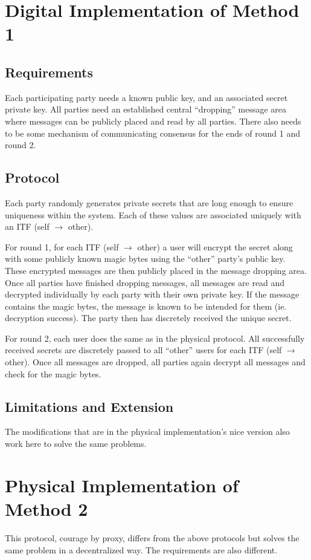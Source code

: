 \documentclass[conference]{IEEEtran}
\begin{document}
\section{Digital Implementation of Method 1}
\subsection{Requirements}
Each participating party needs a known public key, and an associated secret private key. All parties need an established central “dropping” message area where messages can be publicly placed and read by all parties. There also needs to be some mechanism of communicating consensus for the ends of round 1 and round 2.

\subsection{Protocol}
Each party randomly generates private secrets that are long enough to ensure uniqueness within the system. Each of these values are associated uniquely with an ITF (self $\rightarrow$ other).

For round 1, for each ITF (self $\rightarrow$ other) a user will encrypt the secret along with some publicly known magic bytes using the “other” party’s public key. These encrypted messages are then publicly placed in the message dropping area. Once all parties have finished dropping messages, all messages are read and decrypted individually by each party with their own private key. If the message contains the magic bytes, the message is known to be intended for them (ie. decryption success). The party then has discretely received the unique secret.

For round 2, each user does the same as in the physical protocol. All successfully received secrets are discretely passed to all “other” users for each ITF (self $\rightarrow$ other). Once all messages are dropped, all parties again decrypt all messages and check for the magic bytes.

\subsection{Limitations and Extension}
The modifications that are in the physical implementation’s nice version also work here to solve the same problems.


\section{Physical Implementation of Method 2}
This protocol, courage by proxy, differs from the above protocols but solves the same problem in a decentralized way. The requirements are also different.
\end{document}
